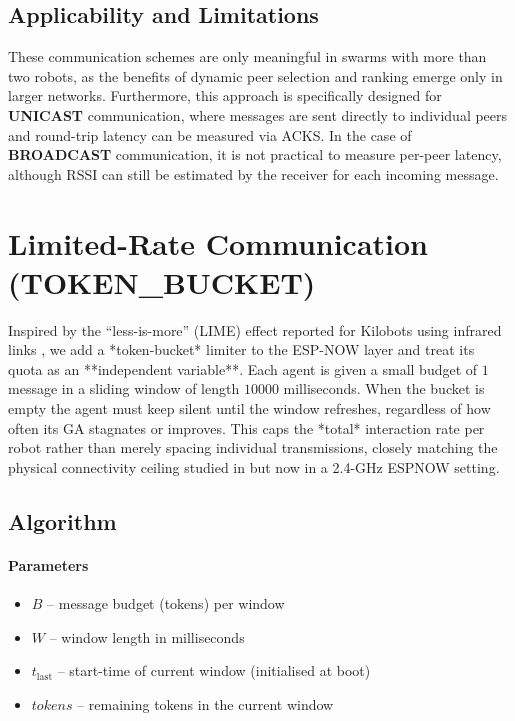 \documentclass[conference]{IEEEtran}
\begin{document}
\subsection{Applicability and Limitations}

These communication schemes are only meaningful in swarms with more than two robots, as the benefits of dynamic peer selection and ranking emerge only in larger networks. Furthermore, this approach is specifically designed for \textbf{UNICAST} communication, where messages are sent directly to individual peers and round-trip latency can be measured via ACKS. In the case of \textbf{BROADCAST} communication, it is not practical to measure per-peer latency, although RSSI can still be estimated by the receiver for each incoming message.


\section{Limited-Rate Communication (TOKEN\_BUCKET)}

Inspired by the “less-is-more” (LIME) effect reported for Kilobots using infrared links \cite{aust_hidden_2022}, we add a *token-bucket* limiter to the ESP-NOW layer and treat its quota as an **independent variable**.  
Each agent is given a small budget of $1$ message in a sliding window of length $10000$ milliseconds.  When the bucket is empty the agent must keep silent until the window refreshes, regardless of how often its GA stagnates or improves.  This caps the *total* interaction rate per robot rather than merely spacing individual transmissions, closely matching the physical connectivity ceiling studied in \cite{aust_hidden_2022} but now in a 2.4-GHz ESPNOW setting.

\subsection{Algorithm}

\paragraph{Parameters}
\begin{itemize}
  \item $B$ – message budget (tokens) per window
  \item $W$ – window length in milliseconds
  \item $t_{\mathrm{last}}$ – start-time of current window (initialised at boot)
  \item $\mathit{tokens}$ – remaining tokens in the current window
\end{itemize}
\end{document}

